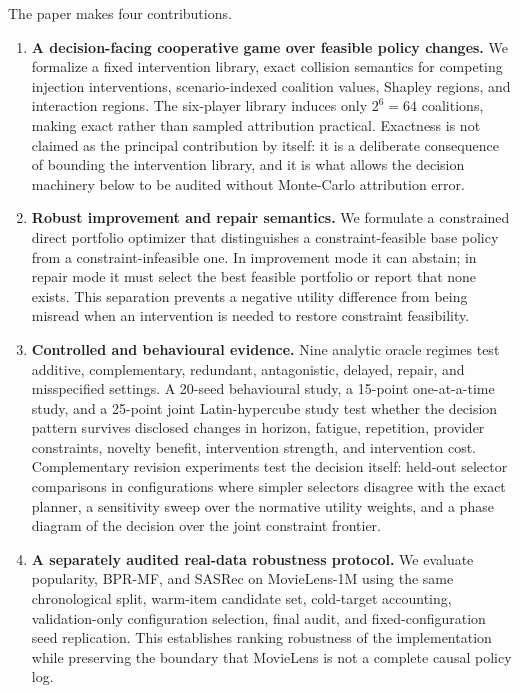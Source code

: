 \documentclass[pdflatex,sn-mathphys-num]{sn-jnl}
\theoremstyle{thmstyleone}
\theoremstyle{thmstyletwo}
\theoremstyle{thmstylethree}
\begin{document}
The paper makes four contributions.
\begin{enumerate}
\item \textbf{A decision-facing cooperative game over feasible policy changes.} We formalize a fixed intervention library, exact collision semantics for competing injection interventions, scenario-indexed coalition values, Shapley regions, and interaction regions. The six-player library induces only $2^6=64$ coalitions, making exact rather than sampled attribution practical. Exactness is not claimed as the principal contribution by itself: it is a deliberate consequence of bounding the intervention library, and it is what allows the decision machinery below to be audited without Monte-Carlo attribution error.
\item \textbf{Robust improvement and repair semantics.} We formulate a constrained direct portfolio optimizer that distinguishes a constraint-feasible base policy from a constraint-infeasible one. In improvement mode it can abstain; in repair mode it must select the best feasible portfolio or report that none exists. This separation prevents a negative utility difference from being misread when an intervention is needed to restore constraint feasibility.
\item \textbf{Controlled and behavioural evidence.} Nine analytic oracle regimes test additive, complementary, redundant, antagonistic, delayed, repair, and misspecified settings. A 20-seed behavioural study, a 15-point one-at-a-time study, and a 25-point joint Latin-hypercube study test whether the decision pattern survives disclosed changes in horizon, fatigue, repetition, provider constraints, novelty benefit, intervention strength, and intervention cost. Complementary revision experiments test the decision itself: held-out selector comparisons in configurations where simpler selectors disagree with the exact planner, a sensitivity sweep over the normative utility weights, and a phase diagram of the decision over the joint constraint frontier.
\item \textbf{A separately audited real-data robustness protocol.} We evaluate popularity, BPR-MF, and SASRec on MovieLens-1M using the same chronological split, warm-item candidate set, cold-target accounting, validation-only configuration selection, final audit, and fixed-configuration seed replication. This establishes ranking robustness of the implementation while preserving the boundary that MovieLens is not a complete causal policy log.
\end{enumerate}
\end{document}

